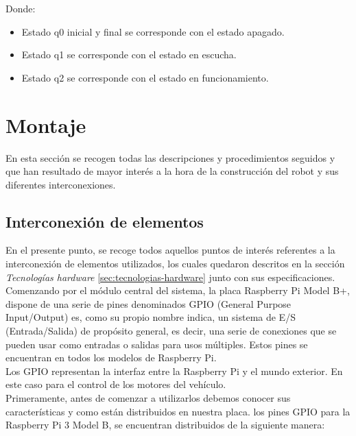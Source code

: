 Donde:\\

\begin{itemize}
  \item Estado q0 inicial y final se corresponde con el estado apagado.
 \item Estado q1 se corresponde con el estado en escucha.
 \item Estado q2 se corresponde con el estado en funcionamiento.
\end{itemize}


\section{Montaje}

En esta sección se recogen todas las descripciones y procedimientos seguidos y que han resultado de mayor interés a la hora de la construcción del robot y sus diferentes interconexiones.\\

\subsection{Interconexión de elementos}

En el presente punto, se recoge todos aquellos puntos de interés referentes a la interconexión de elementos utilizados, los cuales quedaron descritos en la sección \emph{Tecnologías hardware}
\ref{sec:tecnologias-hardware} junto con sus especificaciones.\\

Comenzando por el módulo central del sistema, la placa Raspberry Pi Model B+, dispone de una serie de pines denominados GPIO (General Purpose Input/Output) es, como su propio nombre indica, 
un sistema de E/S (Entrada/Salida) de propósito general, es decir, una serie de conexiones que se pueden usar como entradas o salidas para usos múltiples. Estos pines se encuentran en todos
los modelos de Raspberry Pi.\\

Los GPIO representan la interfaz entre la Raspberry Pi y el mundo exterior. En este caso para el control de los motores del vehículo.\\

Primeramente, antes de comenzar a utilizarlos debemos conocer sus características y como están distribuidos en nuestra placa. los pines GPIO para la Raspberry Pi 3 Model B, se encuentran distribuidos 
de la siguiente manera:

